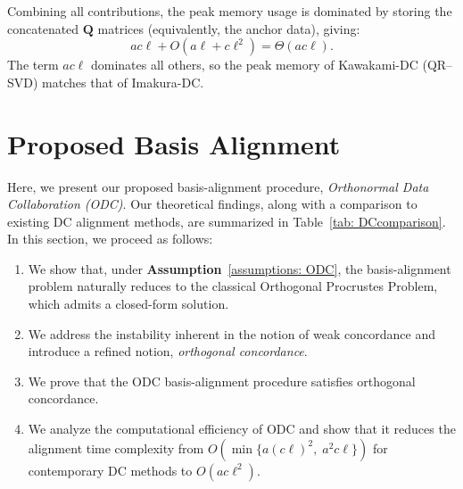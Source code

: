 \documentclass[final,3p,times]{elsarticle}
\theoremstyle{plain}
\newcommand{\matr}[1]{\bm{#1}}        %
\begin{document}
Combining all contributions, the peak memory usage is dominated by storing the concatenated $\matr{Q}$ matrices (equivalently, the anchor data), giving:
\begin{equation}
  a c \ell + O(a\ell + c\ell^{2}) = \Theta(a c \ell).
\end{equation}
The term $a c \ell$ dominates all others, so the peak memory of Kawakami-DC (QR--SVD) matches that of Imakura-DC.

\section{Proposed Basis Alignment}
\label{section: ODC}

Here, we present our proposed basis-alignment procedure, \emph{Orthonormal Data Collaboration (ODC)}. Our theoretical findings, along with a comparison to existing DC alignment methods, are summarized in Table~\ref{tab: DCcomparison}. In this section, we proceed as follows:
\begin{enumerate}
    \item We show that, under \textbf{Assumption}~\ref{assumptions: ODC}, the basis-alignment problem naturally reduces to the classical Orthogonal Procrustes Problem, which admits a closed-form solution.
    \item We address the instability inherent in the notion of weak concordance and introduce a refined notion, \emph{orthogonal concordance}.
    \item We prove that the ODC basis-alignment procedure satisfies orthogonal concordance.
    \item We analyze the computational efficiency of ODC and show that it reduces the alignment time complexity from \(O\!\left(\min\{a(c\ell)^2,\; a^2 c \ell\}\right)\) for contemporary DC methods to \(O(a c \ell^2)\).
\end{enumerate}
\end{document}
